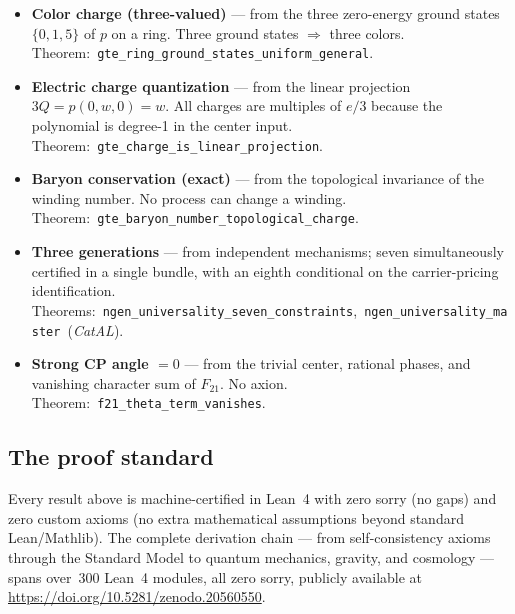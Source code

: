 \documentclass[11pt,a4paper]{article}
\newcommand{\lean}[1]{\texttt{#1}}
\newcommand{\CatAL}{\textit{CatAL}}
\begin{document}
\begin{itemize}[itemsep=5pt]
  \item \textbf{Color charge (three-valued)} --- from the three zero-energy
    ground states $\{0,1,5\}$ of $p$ on a ring.  Three ground states
    $\Rightarrow$ three colors.\\
    \mbox{Theorem: \lean{gte\_ring\_ground\_states\_uniform\_general}.}

  \item \textbf{Electric charge quantization} --- from the linear projection
    $3Q = p(0,w,0) = w$.  All charges are multiples of $e/3$ because the
    polynomial is degree-1 in the center input.\\
    \mbox{Theorem: \lean{gte\_charge\_is\_linear\_projection}.}

  \item \textbf{Baryon conservation (exact)} --- from the topological
    invariance of the winding number.  No process can change a winding.\\
    \mbox{Theorem: \lean{gte\_baryon\_number\_topological\_charge}.}

  \item \textbf{Three generations} --- from independent mechanisms; seven
    simultaneously certified in a single bundle, with an eighth conditional
    on the carrier-pricing identification.\\
    \mbox{Theorems: \lean{ngen\_universality\_seven\_constraints}, \lean{ngen\_universality\_master} (\CatAL).}

  \item \textbf{Strong CP angle $= 0$} --- from the trivial center, rational
    phases, and vanishing character sum of $F_{21}$.  No axion.\\
    \mbox{Theorem: \lean{f21\_theta\_term\_vanishes}.}
\end{itemize}

\subsection{The proof standard}

Every result above is machine-certified in Lean~4 with zero sorry (no gaps)
and zero custom axioms (no extra mathematical assumptions beyond standard
Lean/Mathlib).  The complete derivation chain --- from self-consistency
axioms through the Standard Model to quantum mechanics, gravity, and
cosmology --- spans over~300 Lean~4 modules, all zero sorry, publicly
available at \url{https://doi.org/10.5281/zenodo.20560550}.
\end{document}
